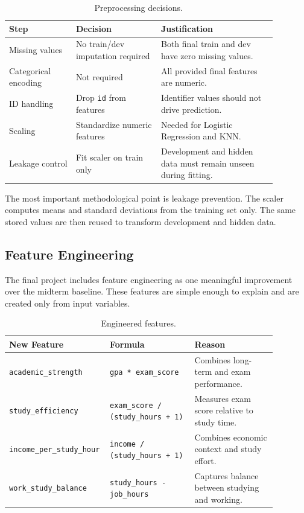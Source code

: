 ﻿\documentclass[12pt,a4paper]{article}
\begin{document}
\begin{table}[H]
\centering
\caption{Preprocessing decisions.}
\small
\begin{tabular}{L{0.22\linewidth}L{0.28\linewidth}L{0.38\linewidth}}
\toprule
\textbf{Step} & \textbf{Decision} & \textbf{Justification} \\
\midrule
Missing values & No train/dev imputation required & Both final train and dev have zero missing values. \\
Categorical encoding & Not required & All provided final features are numeric. \\
ID handling & Drop \texttt{id} from features & Identifier values should not drive prediction. \\
Scaling & Standardize numeric features & Needed for Logistic Regression and KNN. \\
Leakage control & Fit scaler on train only & Development and hidden data must remain unseen during fitting. \\
\bottomrule
\end{tabular}
\end{table}

The most important methodological point is leakage prevention. The scaler computes means and standard deviations from the training set only. The same stored values are then reused to transform development and hidden data.

\clearpage

\subsection{Feature Engineering}

The final project includes feature engineering as one meaningful improvement over the midterm baseline. These features are simple enough to explain and are created only from input variables.

\begin{table}[H]
\centering
\caption{Engineered features.}
\small
\begin{tabular}{L{0.27\linewidth}L{0.31\linewidth}L{0.30\linewidth}}
\toprule
\textbf{New Feature} & \textbf{Formula} & \textbf{Reason} \\
\midrule
\texttt{academic\_strength} & \texttt{gpa * exam\_score} & Combines long-term and exam performance. \\
\texttt{study\_efficiency} & \texttt{exam\_score / (study\_hours + 1)} & Measures exam score relative to study time. \\
\texttt{income\_per\_study\_hour} & \texttt{income / (study\_hours + 1)} & Combines economic context and study effort. \\
\texttt{work\_study\_balance} & \texttt{study\_hours - job\_hours} & Captures balance between studying and working. \\
\bottomrule
\end{tabular}
\end{table}
\end{document}
